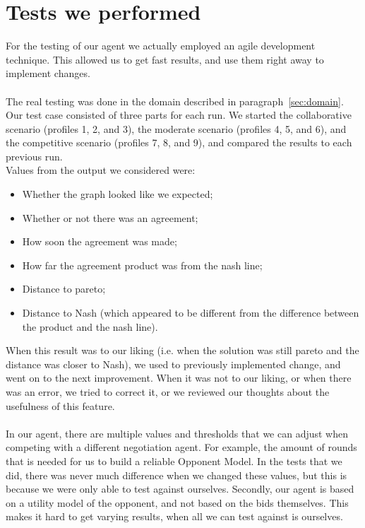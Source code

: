 \section{Tests we performed}
For the testing of our agent we actually employed an agile development technique. This allowed us to get fast results, and use them right away to implement changes.
\\\\
The real testing was done in the domain described in paragraph~\ref{sec:domain}. Our test case consisted of three parts for each run. We started the collaborative scenario (profiles 1, 2, and 3), the moderate scenario (profiles 4, 5, and 6), and the competitive scenario (profiles 7, 8, and 9), and compared the results to each previous run.
\\
Values from the output we considered were:
\begin{itemize}
\item Whether the graph looked like we expected;
\item Whether or not there was an agreement;
\item How soon the agreement was made;
\item How far the agreement product was from the nash line;
\item Distance to pareto;
\item Distance to Nash (which appeared to be different from the difference between the product and the nash line).
\end{itemize}

When this result was to our liking (i.e. when the solution was still pareto and the distance was closer to Nash), we used to previously implemented change, and went on to the next improvement. When it was not to our liking, or when there was an error, we tried to correct it, or we reviewed our thoughts about the usefulness of this feature.
\\\\
In our agent, there are multiple values and thresholds that we can adjust when competing with a different negotiation agent. For example, the amount of rounds that is needed for us to build a reliable Opponent Model. In the tests that we did, there was never much difference when we changed these values, but this is because we were only able to test against ourselves. Secondly, our agent is based on a utility model of the opponent, and not based on the bids themselves. This makes it hard to get varying results, when all we can test against is ourselves. 


